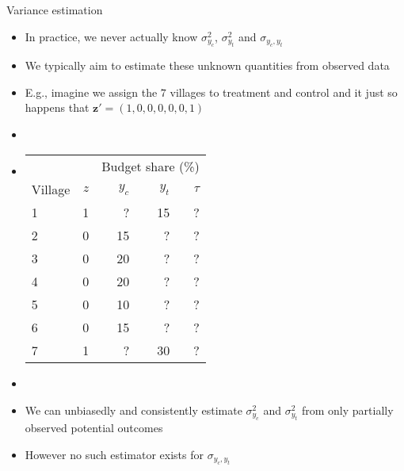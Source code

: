 \documentclass[table, xcolor={dvipsnames}, 9pt]{beamer}
\theoremstyle{newstyle}
\begin{document}
\begin{frame}{Variance estimation} 
\begin{itemize}
\item In practice, we never actually know $\sigma^2_{y_c}$, $\sigma^2_{y_t}$ and $\sigma_{y_c, y_t}$ \pause 
\item We typically aim to estimate these unknown quantities from observed data \pause 
\item E.g., imagine we assign the $7$ villages to treatment and control and it just so happens that $\mathbf{z}' = (1, 0, 0, 0, 0, 0, 1)$ \pause
\item[]  
\item[]
\begin{center}
\begin{tabular}{lr|rrr} \hline
& & \multicolumn{3}{c}{Budget share (\%)} \\
Village & $z$ & $y_{c}$& $y_{t}$& $\tau$  \\ \hline
1& 1 & ?  & 15  & ?  \\
2& 0 & 15 & ?   & ?   \\ 
3& 0 & 20 & ?   & ?   \\
4& 0 & 20 & ?   & ?   \\
5& 0 & 10 & ?   & ?   \\
6& 0 & 15 & ?   & ?   \\
7& 1 & ?  & 30  & ?   \\ \hline
\end{tabular}
\end{center} \pause 
\item[]
\item We can unbiasedly and consistently estimate $\sigma^2_{y_c}$ and $\sigma^2_{y_t}$ from only partially observed potential outcomes \pause
\item However no such estimator exists for $\sigma_{y_c, y_t}$
\end{itemize}
\end{frame}
\end{document}
